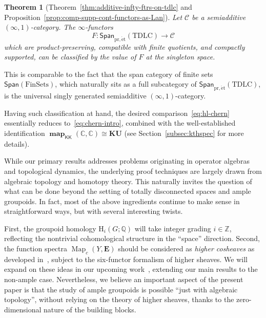 \documentclass[a4paper,reqno]{amsart}
\theoremstyle{plain}
\newtheorem{theoremA}{Theorem}
\theoremstyle{definition}
\theoremstyle{remark}
\numberwithin{equation}{section}
\newcommand{\rH}{\mathrm{H}}
\newcommand{\cC}{\mathcal{C}}
\newcommand{\dC}{\mathbb{C}}
\newcommand{\dQ}{\mathbb{Q}}
\newcommand{\dZ}{\mathbb{Z}}
\newcommand{\bE}{\mathbf{E}}
\newcommand{\Span}{\mathsf{Span}}
\newcommand{\FinSets}{\mathrm{FinSets}}
\newcommand{\icKK}{\mathsf{KK}}
\newcommand{\KU}{\mathbf{KU}}
\newcommand{\pret}{\mathrm{pr,\acute{e}t}}
\newcommand{\TDLC}{\mathrm{TDLC}}
\DeclareMathOperator{\Map}{Map}
\DeclareMathOperator{\map}{\mathbf{map}}
\begin{document}
\begin{theoremA}[Theorem~\ref{thm:additive-infty-ftrs-on-tdlc} and Proposition~\ref{prop:comp-supp-cont-functors-as-Lan}]\label{thm:intro-thm-D}
Let $\cC$ be a semiadditive $(\infty,1)$-category.
The $\infty$-functors
\[
F\colon \Span_{\pret}(\TDLC) \to \cC
\]
which are product-preserving, compatible with finite quotients, and compactly supported, can be classified by the value of $F$ at the singleton space.
\end{theoremA}

This is comparable to the fact that the span category of finite sets $\Span(\FinSets)$, which naturally sits as a full subcategory of $\Span_{\pret}(\TDLC)$, is the universal singly generated semiadditive $(\infty,1)$-category.

Having such classification at hand, the desired comparison~\eqref{eq:hl-chern} essentially reduces to~\eqref{eq:chern-intro}, combined with the well-established identification $\map_{\icKK}(\dC,\dC)\cong \KU$ (see Section~\ref{subsec:kthspec} for more details). 

\medskip

While our primary results addresses problems originating in operator algebras and topological dynamics, the underlying proof techniques are largely drawn from algebraic topology and homotopy theory.
This naturally invites the question of what can be done beyond the setting of totally disconnected spaces and ample groupoids.
In fact, most of the above ingredients continue to make sense in straightforward ways, but with several interesting twists.

First, the groupoid homology $\rH_i(G; \dQ)$ will take integer grading $i \in \dZ$, reflecting the nontrivial cohomological structure in the ``space'' direction.
Second, the function spectra $\Map_c(Y, \bE)$ should be considered as \emph{higher cosheaves} as developed in~\cite{lur:ht}, subject to the six-functor formalism of higher sheaves.
We will expand on these ideas in our upcoming work~\cite{py:upcoming}, extending our main results to the non-ample case.
Nevertheless, we believe an important aspect of the present paper is that the study of ample groupoids is possible ``just with algebraic topology'', without relying on the theory of higher sheaves, thanks to the zero-dimensional nature of the building blocks.

\medskip
\end{document}
